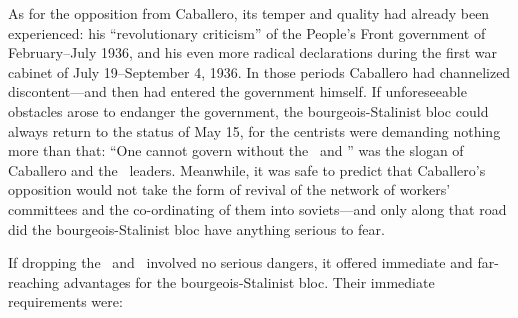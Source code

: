As for the opposition from Caballero, its temper and quality had already been experienced: his ``revolutionary criticism'' of the People’s Front government of February–July 1936, and his even more radical declarations during the first war cabinet of July 19--September 4, 1936. In those periods Caballero had channelized discontent---and then had entered the government himself. If unforeseeable obstacles arose to endanger the government, the bourgeois-Stalinist bloc could always return to the status of May 15, for the centrists were demanding nothing more than that: ``One cannot govern without the \UGT\ and \CNT'' was the slogan of Caballero and the \CNT\ leaders. Meanwhile, it was safe to predict that Caballero’s opposition would not take the form of revival of the network of workers’ committees and the co-ordinating of them into soviets---and only along that road did the bourgeois-Stalinist bloc have anything serious to fear.

If dropping the \UGT\ and \CNT\ involved no serious dangers, it offered immediate and far-reaching advantages for the bourgeois-Stalinist bloc. Their immediate requirements were:

